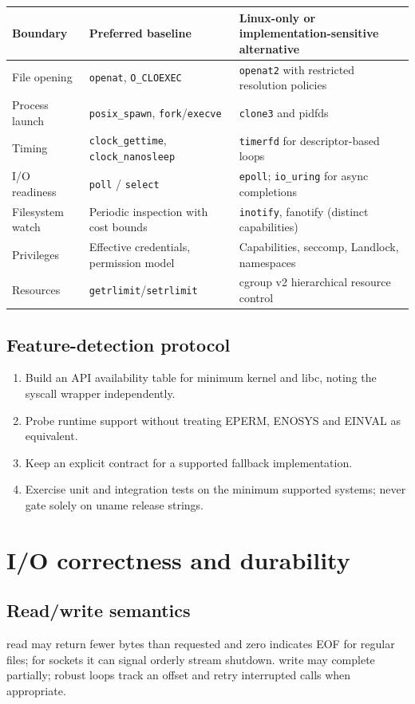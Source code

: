 \documentclass[11pt,letterpaper,oneside]{report}
\newcommand{\sys}[1]{\texttt{#1}}
\begin{document}
\begin{longtable}{>{\raggedright\arraybackslash}p{.22\linewidth}>{\raggedright\arraybackslash}p{.31\linewidth}>{\raggedright\arraybackslash}p{.35\linewidth}}\toprule
Boundary & Preferred baseline & Linux-only or implementation-sensitive alternative\\\midrule\endhead
File opening & \sys{openat}, \sys{O\_CLOEXEC} & \sys{openat2} with restricted resolution policies\\
Process launch & \sys{posix\_spawn}, \sys{fork}/\sys{execve} & \sys{clone3} and pidfds\\
Timing & \sys{clock\_gettime}, \sys{clock\_nanosleep} & \sys{timerfd} for descriptor-based loops\\
I/O readiness & \sys{poll} / \sys{select} & \sys{epoll}; \sys{io\_uring} for async completions\\
Filesystem watch & Periodic inspection with cost bounds & \sys{inotify}, fanotify (distinct capabilities)\\
Privileges & Effective credentials, permission model & Capabilities, seccomp, Landlock, namespaces\\
Resources & \sys{getrlimit}/\sys{setrlimit} & cgroup v2 hierarchical resource control\\
\bottomrule\end{longtable}
\section{Feature-detection protocol}
\begin{enumerate}
\item Build an API availability table for minimum kernel and libc, noting the syscall wrapper independently.
\item Probe runtime support without treating EPERM, ENOSYS and EINVAL as equivalent.
\item Keep an explicit contract for a supported fallback implementation.
\item Exercise unit and integration tests on the minimum supported systems; never gate solely on uname release strings.
\end{enumerate}
\chapter{I/O correctness and durability}
\section{Read/write semantics}
read may return fewer bytes than requested and zero indicates EOF for regular files; for sockets it can signal orderly stream shutdown. write may complete partially; robust loops track an offset and retry interrupted calls when appropriate.
\end{document}
